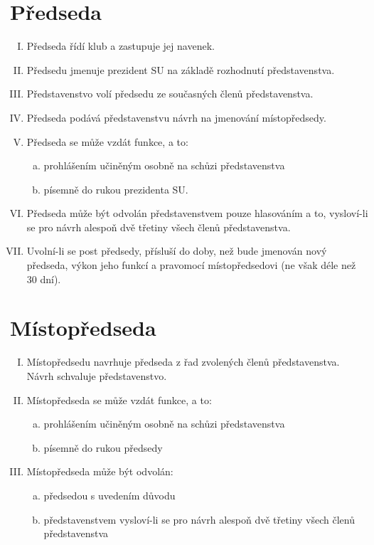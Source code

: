 \documentclass[10pt]{article}
\begin{document}
\section{Předseda} %
	\begin{enumerate}[I.]
	\item Předseda řídí klub a zastupuje jej navenek.  
	\item Předsedu jmenuje prezident SU na základě rozhodnutí představenstva.
	\item Představenstvo volí předsedu ze současných členů představenstva.
	\item Předseda podává představenstvu návrh na jmenování místopředsedy.
	\item Předseda se může vzdát funkce, a to:  
		\begin{enumerate}[a.]
		\item prohlášením učiněným osobně na schůzi představenstva
		\item písemně do rukou prezidenta SU.  
		\end{enumerate}
	\item Předseda může být odvolán představenstvem pouze hlasováním a to, vysloví-li se pro návrh alespoň dvě třetiny všech členů představenstva. 
	\item Uvolní-li se post předsedy, přísluší do doby, než bude jmenován nový předseda, výkon jeho funkcí a pravomocí místopředsedovi (ne však déle než 30 dní).
	\end{enumerate}

\section{Místopředseda}
	\begin{enumerate}[I.]
	\item Místopředsedu navrhuje předseda z řad zvolených členů představenstva. Návrh schvaluje představenstvo.  
	\item Místopředseda se může vzdát funkce, a to:  
		\begin{enumerate}[a.]
		\item prohlášením učiněným osobně na schůzi představenstva
		\item písemně do rukou předsedy  
		\end{enumerate}
	\item Místopředseda může být odvolán:  
		\begin{enumerate}[a.]
		\item předsedou s uvedením důvodu
		\item představenstvem vysloví-li se pro návrh alespoň dvě třetiny všech členů představenstva
		\end{enumerate}
	\end{enumerate}
\end{document}
